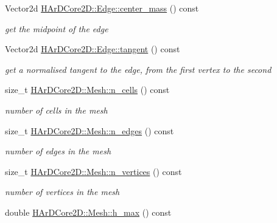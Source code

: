\begin{DoxyCompactItemize}
Vector2d \hyperlink{group__Mesh_ga41ebc04d2b292197a02a9afd25a76a18}{H\+Ar\+D\+Core2\+D\+::\+Edge\+::center\+\_\+mass} () const
\begin{DoxyCompactList}\small\item\em get the midpoint of the edge \end{DoxyCompactList}\item 
\mbox{\label{group__Mesh_ga3362368ff28f1e128bbc46615fd24cd7}} 
Vector2d \hyperlink{group__Mesh_ga3362368ff28f1e128bbc46615fd24cd7}{H\+Ar\+D\+Core2\+D\+::\+Edge\+::tangent} () const
\begin{DoxyCompactList}\small\item\em get a normalised tangent to the edge, from the first vertex to the second \end{DoxyCompactList}\item 
\mbox{\label{group__Mesh_ga2202a0715196c41356692d8adcfe3893}} 
size\+\_\+t \hyperlink{group__Mesh_ga2202a0715196c41356692d8adcfe3893}{H\+Ar\+D\+Core2\+D\+::\+Mesh\+::n\+\_\+cells} () const
\begin{DoxyCompactList}\small\item\em number of cells in the mesh \end{DoxyCompactList}\item 
\mbox{\label{group__Mesh_ga55a1cd5db98bbce8c73ab86b4527859c}} 
size\+\_\+t \hyperlink{group__Mesh_ga55a1cd5db98bbce8c73ab86b4527859c}{H\+Ar\+D\+Core2\+D\+::\+Mesh\+::n\+\_\+edges} () const
\begin{DoxyCompactList}\small\item\em number of edges in the mesh \end{DoxyCompactList}\item 
\mbox{\label{group__Mesh_gadb4a39bfc5444953e7799d28b8e37563}} 
size\+\_\+t \hyperlink{group__Mesh_gadb4a39bfc5444953e7799d28b8e37563}{H\+Ar\+D\+Core2\+D\+::\+Mesh\+::n\+\_\+vertices} () const
\begin{DoxyCompactList}\small\item\em number of vertices in the mesh \end{DoxyCompactList}\item 
\mbox{\label{group__Mesh_ga5f08b04ebac390a2ab8dfe956a90ebbf}} 
double \hyperlink{group__Mesh_ga5f08b04ebac390a2ab8dfe956a90ebbf}{H\+Ar\+D\+Core2\+D\+::\+Mesh\+::h\+\_\+max} () const

\end{DoxyCompactItemize}
